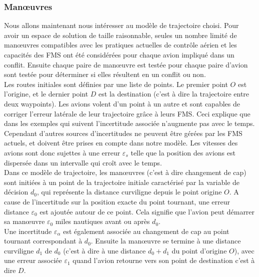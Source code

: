 \subsubsection*{Manœuvres}

Nous allons maintenant nous intéresser au modèle de trajectoire choisi. Pour avoir un espace de solution de taille raisonnable, seules un nombre limité de manœuvres compatibles avec les pratiques actuelles de contrôle aérien et les capacités des FMS ont été considérées pour chaque avion impliqué dans un conflit. Ensuite chaque paire de manœuvre est testée pour chaque paire d'avion sont testée pour déterminer si elles résultent en un conflit ou non. \\

Les routes initiales sont définies par une liste de points. Le premier point $O$ est l'origine, et le dernier point $D$ est la destination (c'est à dire la trajectoire entre deux waypoints). Les avions volent d'un point à un autre et sont capables de corriger l'erreur latérale de leur trajectoire grâce à leurs FMS. Ceci explique que dans les exemples qui suivent l'incertitude associée n'augmente pas avec le temps. Cependant d'autres sources d'incertitudes ne peuvent être gérées par les FMS actuels, et doivent être prises en compte dans notre modèle. Les vitesses des avions sont donc sujettes à une erreur $\varepsilon_{s}$ telle que la position des avions est dispersée dans un intervalle qui croît avec le temps. \\

Dans ce modèle de trajectoire, les manœuvres (c'est à dire changement de cap) sont initiées à un point de la trajectoire initiale caractérisé par la variable de décision $d_{0}$, qui représente la distance curviligne depuis le point origine $O$. A cause de l'incertitude sur la position exacte du point tournant, une erreur distance $\varepsilon_{0}$ est ajoutée autour de ce point. Cela signifie que l'avion peut démarrer sa manœuvre $\varepsilon_{0}$ miles nautiques avant ou après $d_{0}$. \\

Une incertitude $\varepsilon_{\alpha}$ est également associée au changement de cap au point tournant correspondant à $d_{0}$. Ensuite la manœuvre se termine à une distance curviligne $d_{1}$ de $d_{0}$ (c'est à dire à une distance $d_{0} + d_{1}$ du point d'origine $O$), avec une erreur associée $\varepsilon_{1}$ quand l'avion retourne vers son point de destination c'est à dire $D$. \\

